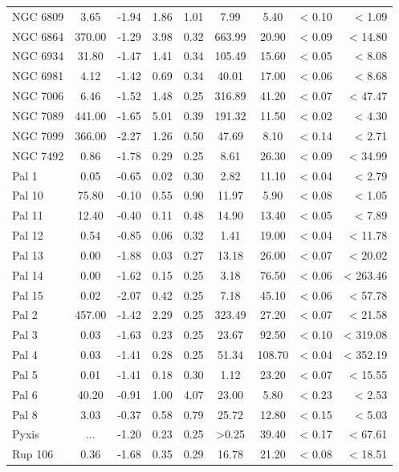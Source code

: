 \documentclass[doublespace,nopageskip]{VTthesis}
\begin{document}
\begin{appendices}
\begin{center}
\begin{longtable}{lcccccccr}
NGC 6809 & 3.65 & -1.94 & 1.86 & 1.01 & 7.99 & 5.40 & < 0.10 & < 1.09\\
NGC 6864 & 370.00 & -1.29 & 3.98 & 0.32 & 663.99 & 20.90 & < 0.09 & < 14.80\\
NGC 6934 & 31.80 & -1.47 & 1.41 & 0.34 & 105.49 & 15.60 & < 0.05 & < 8.08\\
NGC 6981 & 4.12 & -1.42 & 0.69 & 0.34 & 40.01 & 17.00 & < 0.06 & < 8.68\\
NGC 7006 & 6.46 & -1.52 & 1.48 & 0.25 & 316.89 & 41.20 & < 0.07 & < 47.47\\
NGC 7089 & 441.00 & -1.65 & 5.01 & 0.39 & 191.32 & 11.50 & < 0.02 & < 4.30\\
NGC 7099 & 366.00 & -2.27 & 1.26 & 0.50 & 47.69 & 8.10 & < 0.14 & < 2.71\\
NGC 7492 & 0.86 & -1.78 & 0.29 & 0.25 & 8.61 & 26.30 & < 0.09 & < 34.99\\
Pal 1 & 0.05 & -0.65 & 0.02 & 0.30 & 2.82 & 11.10 & < 0.04 & < 2.79\\
Pal 10 & 75.80 & -0.10 & 0.55 & 0.90 & 11.97 & 5.90 & < 0.08 & < 1.05\\
Pal 11 & 12.40 & -0.40 & 0.11 & 0.48 & 14.90 & 13.40 & < 0.05 & < 7.89\\
Pal 12 & 0.54 & -0.85 & 0.06 & 0.32 & 1.41 & 19.00 & < 0.04 & < 11.78\\
Pal 13 & 0.00 & -1.88 & 0.03 & 0.27 & 13.18 & 26.00 & < 0.07 & < 20.02\\
Pal 14 & 0.00 & -1.62 & 0.15 & 0.25 & 3.18 & 76.50 & < 0.06 & < 263.46\\
Pal 15 & 0.02 & -2.07 & 0.42 & 0.25 & 7.18 & 45.10 & < 0.06 & < 57.78\\
Pal 2 & 457.00 & -1.42 & 2.29 & 0.25 & 323.49 & 27.20 & < 0.07 & < 21.58\\
Pal 3 & 0.03 & -1.63 & 0.23 & 0.25 & 23.67 & 92.50 & < 0.10 & < 319.08\\
Pal 4 & 0.03 & -1.41 & 0.28 & 0.25 & 51.34 & 108.70 & < 0.04 & < 352.19\\
Pal 5 & 0.01 & -1.41 & 0.18 & 0.30 & 1.12 & 23.20 & < 0.07 & < 15.55\\
Pal 6 & 40.20 & -0.91 & 1.00 & 4.07 & 23.00 & 5.80 & < 0.23 & < 2.53\\
Pal 8 & 3.03 & -0.37 & 0.58 & 0.79 & 25.72 & 12.80 & < 0.15 & < 5.03\\
Pyxis & ... & -1.20 & 0.23 & 0.25 & >0.25 & 39.40 & < 0.17 & < 67.61\\
Rup 106 & 0.36 & -1.68 & 0.35 & 0.29 & 16.78 & 21.20 & < 0.08 & < 18.51\\

\end{longtable}
\end{center}
\end{appendices}
\end{document}
